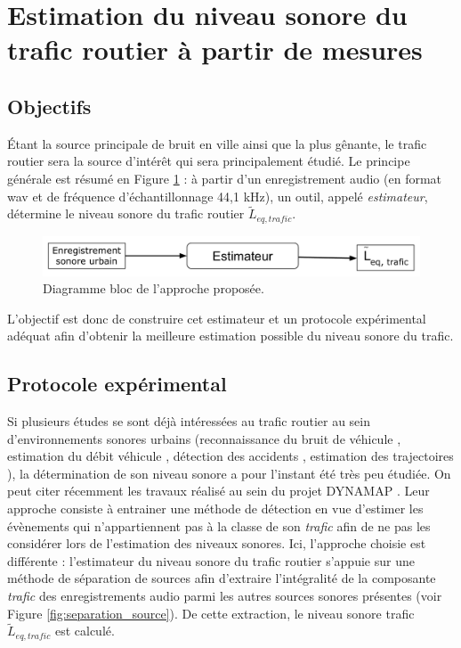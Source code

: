 \section{Estimation du niveau sonore du trafic routier à partir de mesures}

\subsection{Objectifs}
Étant la source principale de bruit en ville ainsi que la plus gênante, le trafic routier sera la source d'intérêt qui sera principalement étudié. Le principe générale est résumé en Figure \ref{fig:estimateur0} : à partir d'un enregistrement audio (en format wav et de fréquence d'échantillonnage 44,1 kHz), un outil, appelé \textit{estimateur}, détermine le niveau sonore du trafic routier $\tilde{L}_{eq,trafic}$.

\begin{figure}[t]
\centering
\includegraphics[width=0.7\linewidth]{./figures/NMF/bloc_diagram_estimateur0.pdf}
\caption{Diagramme bloc de l'approche proposée.}
\label{fig:estimateur0}
\end{figure}

L'objectif est donc de construire cet estimateur et un protocole expérimental adéquat afin d'obtenir la meilleure estimation possible du niveau sonore du trafic.

\subsection{Protocole expérimental}

Si plusieurs études se sont déjà intéressées au trafic routier au sein d'environnements sonores urbains (reconnaissance du bruit de véhicule \cite{defreville_automatic_2006}, estimation du débit véhicule \cite{torija2012using}, détection des accidents \cite{harlow2001automated}, estimation des trajectoires \cite{leiba2017large}), la détermination de son niveau sonore a pour l'instant été très peu étudiée. On peut citer récemment les travaux réalisé au sein du projet DYNAMAP \cite{socoro2017anomalous}. Leur approche consiste à entrainer une méthode de détection en vue d'estimer les évènements qui n'appartiennent pas à la classe de son \textit{trafic} afin de ne pas les considérer lors de l'estimation des niveaux sonores. Ici, l'approche choisie est différente : l'estimateur du niveau sonore du trafic routier s'appuie sur une méthode de séparation de sources afin d'extraire l'intégralité de la composante \textit{trafic} des enregistrements audio parmi les autres sources sonores présentes (voir Figure \ref{fig:separation_source}). De cette extraction, le niveau sonore trafic $\tilde{L}_{eq,trafic}$ est calculé.

